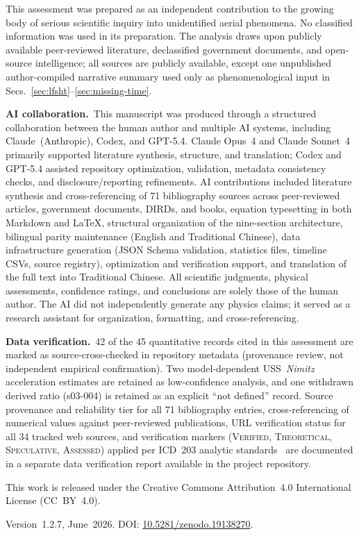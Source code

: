 \documentclass[aps,prd,twocolumn,superscriptaddress,nofootinbib,floatfix]{revtex4-2}
\begin{document}
\begin{acknowledgments}
This assessment was prepared as an independent contribution to the growing body
of serious scientific inquiry into unidentified aerial phenomena. No classified
information was used in its preparation. The analysis draws upon publicly
available peer-reviewed literature, declassified government documents, and
open-source intelligence; all sources are publicly available, except one
unpublished author-compiled narrative summary used only as phenomenological input
in Secs.~\ref{sec:lfsht}--\ref{sec:missing-time}.

\textbf{AI collaboration.}\ This manuscript was produced through a structured
collaboration between the human author and multiple AI systems, including
Claude~(Anthropic), Codex, and GPT-5.4. Claude Opus~4 and Claude Sonnet~4
primarily supported literature synthesis, structure, and translation; Codex and
GPT-5.4 assisted repository optimization, validation, metadata consistency
checks, and disclosure/reporting refinements. AI contributions included literature
synthesis and cross-referencing of 71 bibliography sources across peer-reviewed
articles, government documents, DIRDs, and books, equation typesetting
in both Markdown and \LaTeX, structural organization of the nine-section
architecture, bilingual parity maintenance (English and Traditional Chinese),
data infrastructure generation (JSON Schema validation, statistics files, timeline
CSVs, source registry), optimization and verification support, and translation of
the full text into Traditional Chinese.
All scientific judgments, physical assessments, confidence ratings, and conclusions
are solely those of the human author. The AI did not independently generate any
physics claims; it served as a research assistant for organization, formatting,
and cross-referencing.

\textbf{Data verification.}\ 42 of the 45 quantitative records cited in this
assessment are marked as source-cross-checked in repository metadata (provenance
review, not independent empirical confirmation). Two model-dependent
USS~\textit{Nimitz} acceleration estimates are retained as low-confidence
analysis, and one withdrawn derived ratio (s03-004) is retained as an explicit
``not defined'' record. Source provenance and reliability tier for all 71
bibliography entries, cross-referencing of numerical values against peer-reviewed
publications, URL verification status for all 34 tracked web sources, and
verification markers (\textsc{Verified}, \textsc{Theoretical},
\textsc{Speculative}, \textsc{Assessed}) applied per ICD~203 analytic standards~\cite{ICD203} are
documented in a separate data verification report available in the project
repository.

This work is released under the Creative Commons Attribution~4.0 International
License (CC~BY~4.0).

Version~1.2.7, June~2026.
DOI: \href{https://doi.org/10.5281/zenodo.19138270}{10.5281/zenodo.19138270}.
\end{acknowledgments}

\nocite{AbbottLIGO2016,Kaku2008}


\end{document}
